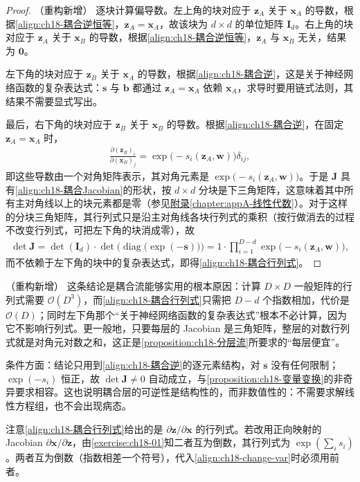 \documentclass[../../main.tex]{subfiles}
\begin{document}
\begin{proof}（重构新增）
逐块计算偏导数。左上角的块对应于 $\bm{z}_A$ 关于 $\bm{x}_A$ 的导数，根据\eqref{align:ch18-耦合逆恒等}，$\bm{z}_A=\bm{x}_A$，故该块为 $d\times d$ 的单位矩阵 $\bm{I}_d$。右上角的块对应于 $\bm{z}_A$ 关于 $\bm{x}_B$ 的导数，根据\eqref{align:ch18-耦合逆恒等}，$\bm{z}_A$ 与 $\bm{x}_B$ 无关，结果为 $\bm{0}$。

左下角的块对应于 $\bm{z}_B$ 关于 $\bm{x}_A$ 的导数，根据\eqref{align:ch18-耦合逆}，这是关于神经网络函数的复杂表达式：$\bm{s}$ 与 $\bm{b}$ 都通过 $\bm{z}_A=\bm{x}_A$ 依赖 $\bm{x}_A$，求导时要用链式法则，其结果不需要显式写出。

最后，右下角的块对应于 $\bm{z}_B$ 关于 $\bm{x}_B$ 的导数。根据\eqref{align:ch18-耦合逆}，在固定 $\bm{z}_A=\bm{x}_A$ 时，
\begin{align*}
  \frac{\partial(\bm{z}_B)_i}{\partial(\bm{x}_B)_j}=\exp\big(-s_i(\bm{z}_A,\bm{w})\big)\delta_{ij},
\end{align*}
即这些导数由一个对角矩阵表示，其对角元素是 $\exp\big(-s_i(\bm{z}_A,\bm{w})\big)$。于是 $\bm{J}$ 具有\eqref{align:ch18-耦合Jacobian}的形状，按 $d\times d$ 分块是下三角矩阵，这意味着其中所有主对角线以上的块元素都是零（参见\hyperref[chapter:appA-线性代数]{附录\ref*{chapter:appA-线性代数}}）。对于这样的分块三角矩阵，其行列式只是沿主对角线各块行列式的乘积（按行做消去的过程不改变行列式，可把左下角的块消成零），故
\begin{align*}
  \det\bm{J}=\det(\bm{I}_d)\cdot\det\Big(\operatorname{diag}\big(\exp(-\bm{s})\big)\Big)=1\cdot\prod_{i=1}^{D-d}\exp\big(-s_i(\bm{z}_A,\bm{w})\big),
\end{align*}
而不依赖于左下角的块中的复杂表达式，即得\eqref{align:ch18-耦合行列式}。
\end{proof}

\begin{remark}（重构新增）
这条结论是耦合流能够实用的根本原因：计算 $D\times D$ 一般矩阵的行列式需要 $\mathcal{O}(D^{3})$，而\eqref{align:ch18-耦合行列式}只需把 $D-d$ 个指数相加，代价是 $\mathcal{O}(D)$；同时左下角那个“关于神经网络函数的复杂表达式”根本不必计算，因为它不影响行列式。更一般地，只要每层的 Jacobian 是三角矩阵，整层的对数行列式就是对角元对数之和，这正是\cref{proposition:ch18-分层流}所要求的“每层便宜”。

条件方面：结论只用到\eqref{align:ch18-耦合逆}的逐元素结构，对 $\bm{s}$ 没有任何限制；$\exp(-s_i)$ 恒正，故 $\det\bm{J}\neq0$ 自动成立，与\cref{proposition:ch18-变量变换}的非奇异要求相容。这也说明耦合层的可逆性是结构性的，而非数值性的：不需要求解线性方程组，也不会出现病态。

注意\eqref{align:ch18-耦合行列式}给出的是 $\partial\bm{z}/\partial\bm{x}$ 的行列式。若改用正向映射的 Jacobian $\partial\bm{x}/\partial\bm{z}$，由\cref{exercise:ch18-01}知二者互为倒数，其行列式为 $\exp\left(\sum_i s_i\right)$。两者互为倒数（指数相差一个符号），代入\eqref{align:ch18-change-var}时必须用前者。
\end{remark}
\end{document}
